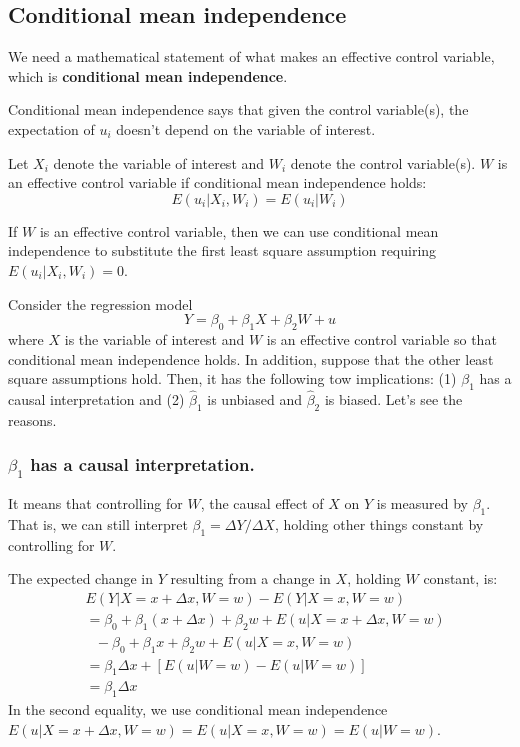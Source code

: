 \documentclass[a4paper,11pt]{article}
\begin{document}
\subsection{Conditional mean independence}
\label{sec:org849901b}

We need a mathematical statement of what makes an effective control
variable, which is \textbf{conditional mean independence}.

Conditional mean independence says that given the control variable(s),
the expectation of \(u_i\) doesn’t depend on the variable of interest.

Let \(X_i\) denote the variable of interest and \(W_i\) denote the control
variable(s).  \(W\) is an effective control variable if conditional mean
independence holds:
\[ E(u_i|X_i, W_i) = E(u_i|W_i) \]

If \(W\) is an effective control variable, then we can use conditional
mean independence to substitute the first least square assumption
requiring \(E(u_i | X_i, W_i) = 0\).

Consider the regression model \[ Y = \beta_0 + \beta_1 X + \beta_2 W +
u \] where \(X\) is the variable of interest and \(W\) is an effective
control variable so that conditional mean independence holds. In
addition, suppose that the other least square assumptions hold. Then,
it has the following tow implications: (1) \(\beta_1\) has a causal
interpretation and (2) \(\hat{\beta}_1\) is unbiased and \(\hat{\beta}_2\)
is biased. Let's see the reasons.

\subsubsection*{\(\beta_1\) has a causal interpretation.}
\label{sec:org1ee2910}

It means that controlling for \(W\), the causal effect of \(X\) on \(Y\) is
measured by \(\beta_1\). That is, we can still interpret \(\beta_1 =
\Delta Y / \Delta X\), holding other things constant by controlling for
\(W\).

The expected change in \(Y\) resulting from a change in \(X\), holding \(W\)
constant, is:
\begin{equation*}
\begin{split}
& E(Y|X = x + \Delta x, W = w) - E(Y|X = x, W = w) \\
&= \beta_0 + \beta_1(x + \Delta x) + \beta_2 w + E(u|X = x + \Delta x, W = w) \\
&\text{ } - \beta_0 + \beta_1 x + \beta_2 w + E(u|X = x, W = w) \\
&= \beta_1 \Delta x + \left[ E(u|W = w) -  E(u|W = w) \right] \\
&= \beta_1 \Delta x
\end{split}
\end{equation*}
In the second equality, we use conditional mean independence \(E(u|X =
x + \Delta x, W = w) = E(u|X = x, W = w) = E(u|W = w)\).
\end{document}

